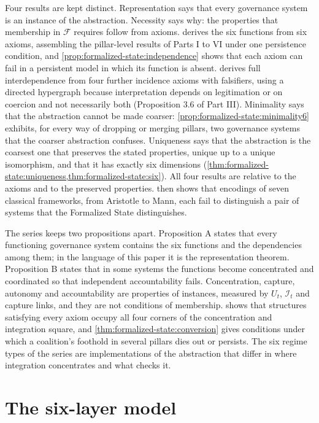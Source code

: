 \documentclass[11pt,letterpaper]{article}
\theoremstyle{definition}
\theoremstyle{remark}
\newcommand{\Integ}{\mathcal{I}}
\begin{document}
Four results are kept distinct. Representation says that every governance system is an instance of the abstraction. Necessity says why: the properties that membership in $\mathcal{F}$ requires follow from axioms.  derives the six functions from six axioms, assembling the pillar-level results of Parts I to VI under one persistence condition, and \cref{prop:formalized-state:independence} shows that each axiom can fail in a persistent model in which its function is absent.  derives full interdependence from four further incidence axioms with falsifiers, using a directed hypergraph because interpretation depends on legitimation or on coercion and not necessarily both (Proposition 3.6 of Part III). Minimality says that the abstraction cannot be made coarser: \cref{prop:formalized-state:minimality6} exhibits, for every way of dropping or merging pillars, two governance systems that the coarser abstraction confuses. Uniqueness says that the abstraction is the coarsest one that preserves the stated properties, unique up to a unique isomorphism, and that it has exactly six dimensions (\cref{thm:formalized-state:uniqueness,thm:formalized-state:six}). All four results are relative to the axioms and to the preserved properties.  then shows that encodings of seven classical frameworks, from Aristotle to Mann, each fail to distinguish a pair of systems that the Formalized State distinguishes.

The series keeps two propositions apart. Proposition A states that every functioning governance system contains the six functions and the dependencies among them; in the language of this paper it is the representation theorem. Proposition B states that in some systems the functions become concentrated and coordinated so that independent accountability fails. Concentration, capture, autonomy and accountability are properties of instances, measured by $U_t$, $\Integ_t$ and capture links, and they are not conditions of membership.  shows that structures satisfying every axiom occupy all four corners of the concentration and integration square, and \cref{thm:formalized-state:conversion} gives conditions under which a coalition's foothold in several pillars dies out or persists. The six regime types of the series are implementations of the abstraction that differ in where integration concentrates and what checks it.

\section{The six-layer model}
\label{sec:model}
\end{document}
